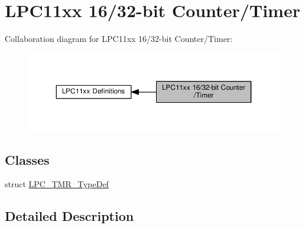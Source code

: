 \hypertarget{group___l_p_c11xx___t_m_r}{}\section{L\+P\+C11xx 16/32-\/bit Counter/\+Timer}
\label{group___l_p_c11xx___t_m_r}
Collaboration diagram for L\+P\+C11xx 16/32-\/bit Counter/\+Timer\+:\nopagebreak
\begin{figure}[H]
\begin{center}
\leavevmode
\includegraphics[width=350pt]{group___l_p_c11xx___t_m_r}
\end{center}
\end{figure}
\subsection*{Classes}
\begin{DoxyCompactItemize}
\item 
struct \hyperlink{struct_l_p_c___t_m_r___type_def}{L\+P\+C\+\_\+\+T\+M\+R\+\_\+\+Type\+Def}
\end{DoxyCompactItemize}


\subsection{Detailed Description}
